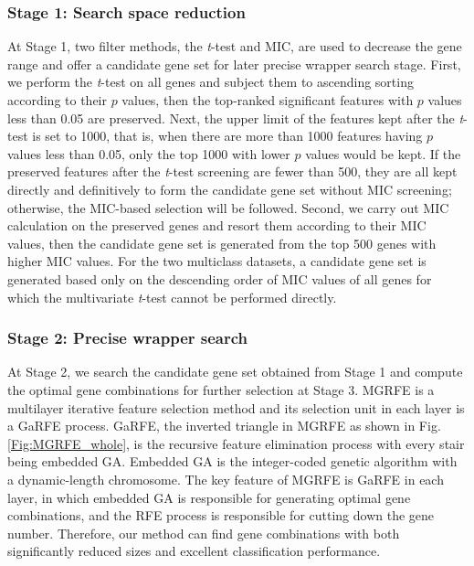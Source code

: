 \documentclass[10pt,journal,compsoc]{IEEEtran}
\begin{document}
	\subsubsection{Stage 1: Search space reduction}
	
	At Stage 1, two filter methods, the \textit{t}-test and MIC, are used to decrease the gene range and offer a candidate gene set for later precise wrapper search stage. First, we perform the \textit{t}-test on all genes and subject them to ascending sorting according to their $p$ values, then the top-ranked significant features with $p$ values less than 0.05 are preserved. Next, the upper limit of the features kept after the \textit{t}-test is set to 1000, that is, when there are more than 1000 features having $p$ values less than 0.05, only the top 1000 with lower $p$ values would be kept. If the preserved features after the \textit{t}-test screening are fewer than 500, they are all kept directly and definitively to form the candidate gene set without MIC screening; otherwise, the MIC-based selection will be followed. Second, we carry out MIC calculation on the preserved genes and resort them according to their MIC values, then the candidate gene set is generated from the top 500 genes with higher MIC values. For the two multiclass datasets, a candidate gene set is generated based only on the descending order of MIC values of all genes for which the multivariate \textit{t}-test cannot be performed directly.
	
	\subsubsection{Stage 2: Precise wrapper search}
	
	At Stage 2, we search the candidate gene set obtained from Stage 1 and compute the optimal gene combinations for further selection at Stage 3. MGRFE is a multilayer iterative feature selection method and its selection unit in each layer is a GaRFE process. GaRFE, the inverted triangle in MGRFE as shown in Fig. \ref{Fig:MGRFE_whole}, is the recursive feature elimination process with every stair being embedded GA. Embedded GA is the integer-coded genetic algorithm with a dynamic-length chromosome. The key feature of MGRFE is GaRFE in each layer, in which embedded GA is responsible for generating optimal gene combinations, and the RFE process is responsible for cutting down the gene number. Therefore, our method can find gene combinations with both significantly reduced sizes and excellent classification performance.
	
\end{document}

